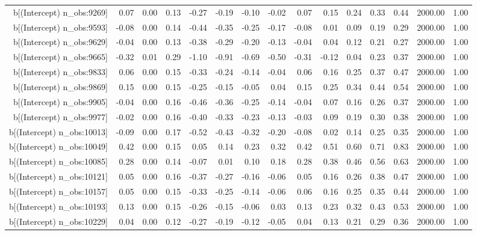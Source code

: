 \begin{table}[ht]
\begin{tabular}{rrrrrrrrrrrrrrr}
  b[(Intercept) n\_obs:9269] & 0.07 & 0.00 & 0.13 & -0.27 & -0.19 & -0.10 & -0.02 & 0.07 & 0.15 & 0.24 & 0.33 & 0.44 & 2000.00 & 1.00 \\ 
  b[(Intercept) n\_obs:9593] & -0.08 & 0.00 & 0.14 & -0.44 & -0.35 & -0.25 & -0.17 & -0.08 & 0.01 & 0.09 & 0.19 & 0.29 & 2000.00 & 1.00 \\ 
  b[(Intercept) n\_obs:9629] & -0.04 & 0.00 & 0.13 & -0.38 & -0.29 & -0.20 & -0.13 & -0.04 & 0.04 & 0.12 & 0.21 & 0.27 & 2000.00 & 1.00 \\ 
  b[(Intercept) n\_obs:9665] & -0.32 & 0.01 & 0.29 & -1.10 & -0.91 & -0.69 & -0.50 & -0.31 & -0.12 & 0.04 & 0.23 & 0.37 & 2000.00 & 1.00 \\ 
  b[(Intercept) n\_obs:9833] & 0.06 & 0.00 & 0.15 & -0.33 & -0.24 & -0.14 & -0.04 & 0.06 & 0.16 & 0.25 & 0.37 & 0.47 & 2000.00 & 1.00 \\ 
  b[(Intercept) n\_obs:9869] & 0.15 & 0.00 & 0.15 & -0.25 & -0.15 & -0.05 & 0.04 & 0.15 & 0.25 & 0.34 & 0.44 & 0.54 & 2000.00 & 1.00 \\ 
  b[(Intercept) n\_obs:9905] & -0.04 & 0.00 & 0.16 & -0.46 & -0.36 & -0.25 & -0.14 & -0.04 & 0.07 & 0.16 & 0.26 & 0.37 & 2000.00 & 1.00 \\ 
  b[(Intercept) n\_obs:9977] & -0.02 & 0.00 & 0.16 & -0.40 & -0.33 & -0.23 & -0.13 & -0.03 & 0.09 & 0.19 & 0.30 & 0.38 & 2000.00 & 1.00 \\ 
  b[(Intercept) n\_obs:10013] & -0.09 & 0.00 & 0.17 & -0.52 & -0.43 & -0.32 & -0.20 & -0.08 & 0.02 & 0.14 & 0.25 & 0.35 & 2000.00 & 1.00 \\ 
  b[(Intercept) n\_obs:10049] & 0.42 & 0.00 & 0.15 & 0.05 & 0.14 & 0.23 & 0.32 & 0.42 & 0.51 & 0.60 & 0.71 & 0.83 & 2000.00 & 1.00 \\ 
  b[(Intercept) n\_obs:10085] & 0.28 & 0.00 & 0.14 & -0.07 & 0.01 & 0.10 & 0.18 & 0.28 & 0.38 & 0.46 & 0.56 & 0.63 & 2000.00 & 1.00 \\ 
  b[(Intercept) n\_obs:10121] & 0.05 & 0.00 & 0.16 & -0.37 & -0.27 & -0.16 & -0.06 & 0.05 & 0.16 & 0.26 & 0.38 & 0.47 & 2000.00 & 1.00 \\ 
  b[(Intercept) n\_obs:10157] & 0.05 & 0.00 & 0.15 & -0.33 & -0.25 & -0.14 & -0.06 & 0.06 & 0.16 & 0.25 & 0.35 & 0.44 & 2000.00 & 1.00 \\ 
  b[(Intercept) n\_obs:10193] & 0.13 & 0.00 & 0.15 & -0.26 & -0.15 & -0.06 & 0.03 & 0.13 & 0.23 & 0.32 & 0.43 & 0.53 & 2000.00 & 1.00 \\ 
  b[(Intercept) n\_obs:10229] & 0.04 & 0.00 & 0.12 & -0.27 & -0.19 & -0.12 & -0.05 & 0.04 & 0.13 & 0.21 & 0.29 & 0.36 & 2000.00 & 1.00 \\ 

\end{tabular}
\end{table}
